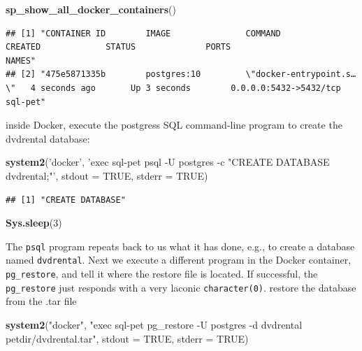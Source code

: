 \documentclass[]{book}
\newenvironment{Shaded}{\begin{snugshade}}{\end{snugshade}}
\newcommand{\DataTypeTok}[1]{\textcolor[rgb]{0.13,0.29,0.53}{#1}}
\newcommand{\DecValTok}[1]{\textcolor[rgb]{0.00,0.00,0.81}{#1}}
\newcommand{\KeywordTok}[1]{\textcolor[rgb]{0.13,0.29,0.53}{\textbf{#1}}}
\newcommand{\NormalTok}[1]{#1}
\newcommand{\OtherTok}[1]{\textcolor[rgb]{0.56,0.35,0.01}{#1}}
\newcommand{\StringTok}[1]{\textcolor[rgb]{0.31,0.60,0.02}{#1}}
\theoremstyle{definition}
\theoremstyle{definition}
\theoremstyle{definition}
\theoremstyle{remark}
\begin{document}
\begin{Shaded}
\begin{Highlighting}[]
\KeywordTok{sp_show_all_docker_containers}\NormalTok{()}
\end{Highlighting}
\end{Shaded}

\begin{verbatim}
## [1] "CONTAINER ID        IMAGE               COMMAND                  CREATED             STATUS              PORTS                    NAMES"    
## [2] "475e5871335b        postgres:10         \"docker-entrypoint.s…\"   4 seconds ago       Up 3 seconds        0.0.0.0:5432->5432/tcp   sql-pet"
\end{verbatim}

inside Docker, execute the postgress SQL command-line program to create
the dvdrental database:

\begin{Shaded}
\begin{Highlighting}[]
\KeywordTok{system2}\NormalTok{(}\StringTok{'docker'}\NormalTok{, }\StringTok{'exec sql-pet psql -U postgres -c "CREATE DATABASE dvdrental;"'}\NormalTok{,}
        \DataTypeTok{stdout =} \OtherTok{TRUE}\NormalTok{, }\DataTypeTok{stderr =} \OtherTok{TRUE}\NormalTok{)}
\end{Highlighting}
\end{Shaded}

\begin{verbatim}
## [1] "CREATE DATABASE"
\end{verbatim}

\begin{Shaded}
\begin{Highlighting}[]
\KeywordTok{Sys.sleep}\NormalTok{(}\DecValTok{3}\NormalTok{)}
\end{Highlighting}
\end{Shaded}

The \texttt{psql} program repeats back to us what it has done, e.g., to
create a database named \texttt{dvdrental}. Next we execute a different
program in the Docker container, \texttt{pg\_restore}, and tell it where
the restore file is located. If successful, the \texttt{pg\_restore}
just responds with a very laconic \texttt{character(0)}. restore the
database from the .tar file

\begin{Shaded}
\begin{Highlighting}[]
\KeywordTok{system2}\NormalTok{(}\StringTok{"docker"}\NormalTok{, }\StringTok{"exec sql-pet pg_restore -U postgres -d dvdrental petdir/dvdrental.tar"}\NormalTok{, }\DataTypeTok{stdout =} \OtherTok{TRUE}\NormalTok{, }\DataTypeTok{stderr =} \OtherTok{TRUE}\NormalTok{)}
\end{Highlighting}
\end{Shaded}
\end{document}
